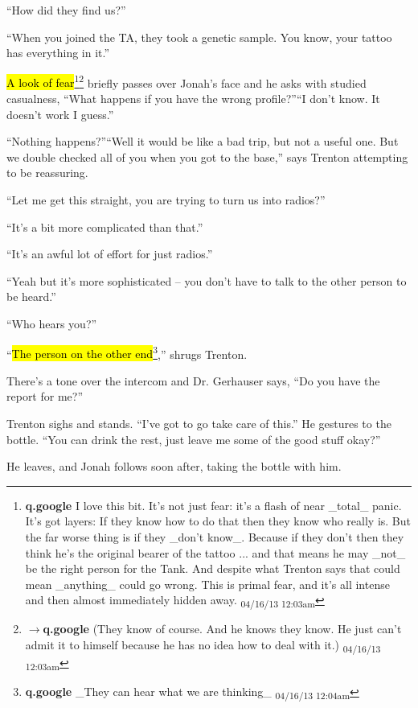``How did they find us?''

``When you joined the TA, they took a genetic sample.  You know, your tattoo has everything in it.''

\hl{A look of fear}\footnote{\textbf{q.google }I love this bit.  It's not just fear: it's a flash of near \_total\_ panic.  It's got layers: If they know how to do that then they know who really is.  But the far worse thing is if they \_don't know\_.  Because if they don't then they think he's the original bearer of the tattoo ... and that means he may \_not\_ be the right person for the Tank.  And despite what Trenton says that could mean \_anything\_ could go wrong.  This is primal fear, and it's all intense and then almost immediately hidden away. \textsubscript{04/16/13 12:03am}}\footnote{$\rightarrow$\textbf{q.google }(They know of course.  And he knows they know.  He just can't admit it to himself because he has no idea how to deal with it.) \textsubscript{04/16/13 12:03am}} briefly passes over Jonah's face and he asks with studied casualness, ``What happens if you have the wrong profile?''``I don't know.  It doesn't work I guess.''

``Nothing happens?''``Well it would be like a bad trip, but not a useful one.  But we double checked all of you when you got to the base,'' says Trenton attempting to be reassuring.

``Let me get this straight, you are trying to turn us into radios?''

``It's a bit more complicated than that.''

``It's an awful lot of effort for just radios.''

``Yeah but it's more sophisticated -- you don't have to talk to the other person to be heard.''

``Who hears you?''

``\hl{The person on the other end}\footnote{\textbf{q.google }\_They can hear what we are thinking\_ \textsubscript{04/16/13 12:04am}},'' shrugs Trenton.

There's a tone over the intercom and Dr. Gerhauser says, ``Do you have the report for me?''

Trenton sighs and stands.  ``I've got to go take care of this.''  He gestures to the bottle.  ``You can drink the rest, just leave me some of the good stuff okay?''

He leaves, and Jonah follows soon after, taking the bottle with him.



